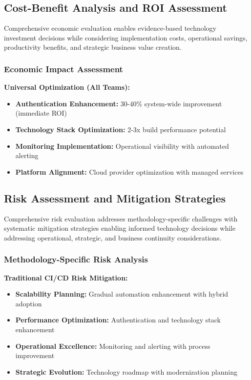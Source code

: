\subsection{Cost-Benefit Analysis and ROI Assessment}
\label{subsec:cost_benefit_analysis}

Comprehensive economic evaluation enables evidence-based technology investment decisions while considering implementation costs, operational savings, productivity benefits, and strategic business value creation.

\subsubsection{Economic Impact Assessment}



\textbf{Universal Optimization (All Teams):}
\begin{itemize}
\item \textbf{Authentication Enhancement:} 30-40\% system-wide improvement (immediate ROI)
\item \textbf{Technology Stack Optimization:} 2-3x build performance potential
\item \textbf{Monitoring Implementation:} Operational visibility with automated alerting
\item \textbf{Platform Alignment:} Cloud provider optimization with managed services
\end{itemize}

\subsection{Risk Assessment and Mitigation Strategies}
\label{subsec:risk_assessment}

Comprehensive risk evaluation addresses methodology-specific challenges with systematic mitigation strategies enabling informed technology decisions while addressing operational, strategic, and business continuity considerations.

\subsubsection{Methodology-Specific Risk Analysis}


\textbf{Traditional CI/CD Risk Mitigation:}
\begin{itemize}
\item \textbf{Scalability Planning:} Gradual automation enhancement with hybrid adoption
\item \textbf{Performance Optimization:} Authentication and technology stack enhancement
\item \textbf{Operational Excellence:} Monitoring and alerting with process improvement
\item \textbf{Strategic Evolution:} Technology roadmap with modernization planning
\end{itemize}

